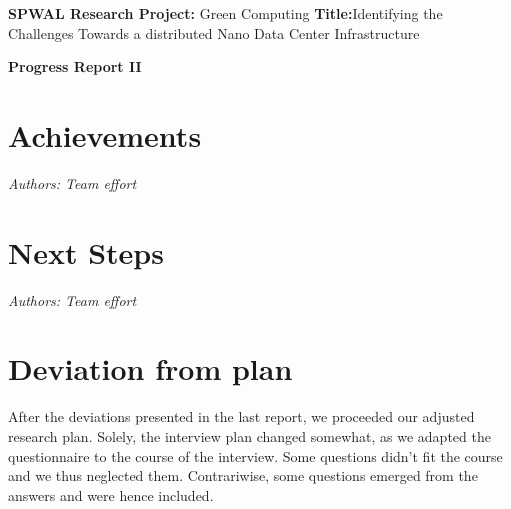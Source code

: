 \documentclass[sigchi-a, authorversion]{acmart}
\begin{document}
\begin{sidebar}
  \textbf{SPWAL Research Project:} Green Computing
  \textbf{Title:}Identifying the Challenges Towards a distributed Nano Data Center Infrastructure

  \textbf{Progress Report II}

%  
%  
%
\end{sidebar}



\section{Achievements}
\textit{Authors: Team effort}\\

\section{Next Steps}
\textit{Authors: Team effort}\\

\section{Deviation from plan}
After the deviations presented in the last report, we proceeded our adjusted research plan. Solely, the interview plan changed somewhat, as we adapted the questionnaire to the course of the interview. Some questions didn't fit the course and we thus neglected them. Contrariwise, some questions emerged from the answers and were hence included. 
\end{document}
